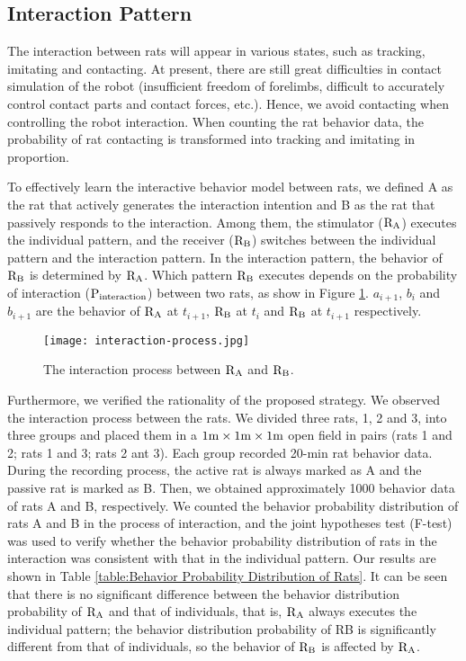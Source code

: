 \subsection{Interaction Pattern}
The interaction between rats will appear in various states, such as tracking, imitating and contacting. At present, there are still great difficulties in contact simulation of the robot (insufficient freedom of forelimbs, difficult to accurately control contact parts and contact forces, etc.). Hence, we avoid contacting when controlling the robot interaction. When counting the rat behavior data, the probability of rat contacting is transformed into tracking and imitating in proportion.

To effectively learn the interactive behavior model between rats, we defined A as the rat that actively generates the interaction intention and B as the rat that passively responds to the interaction. Among them, the stimulator (${\rm R_A}$) executes the individual pattern, and the receiver (${\rm R_B}$) switches between the individual pattern and the interaction pattern. In the interaction pattern, the behavior of ${\rm R_B}$ is determined by ${\rm R_A}$. Which pattern ${\rm R_B}$ executes depends on the probability of interaction ($\rm P_{interaction}$) between two rats, as show in Figure \ref{interaction-process}. $a_{i+1}$, $b_i$ and $b_{i+1}$ are the behavior of ${\rm R_A}$ at $t_{i+1}$, ${\rm R_B}$ at $t_i$ and ${\rm R_B}$ at $t_{i+1}$ respectively.
\begin{figure}[h]
    \centering
    \texttt{[image: interaction-process.jpg]}
    \caption{The interaction process between $\rm R_A$ and $\rm R_B$.}
    \label{interaction-process}
\end{figure}
Furthermore, we verified the rationality of the proposed strategy. We observed the interaction process between the rats. We divided three rats, 1, 2 and 3, into three groups and placed them in a $1{\rm m}\times 1{\rm m}\times 1{\rm m}$ open field in pairs (rats 1 and 2; rats 1 and 3; rats 2 ant 3). Each group recorded 20-min rat behavior data. During the recording process, the active rat is always marked as A and the passive rat is marked as B. Then, we obtained approximately 1000 behavior data of rats A and B, respectively. We counted the behavior probability distribution of rats A and B in the process of interaction, and the joint hypotheses test (F-test) was used to verify whether the behavior probability distribution of rats in the interaction was consistent with that in the individual pattern. Our results are shown in Table \ref{table:Behavior Probability Distribution of Rats}. It can be seen that there is no significant difference between the behavior distribution probability of $\rm R_A$ and that of individuals, that is, $\rm R_A$ always executes the individual pattern; the behavior distribution probability of RB is significantly different from that of individuals, so the behavior of $\rm R_B$ is affected by $\rm R_A$.
